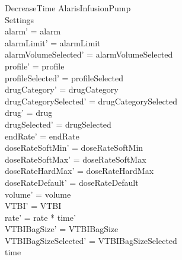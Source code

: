 \begin{schema}{DecreaseTime}
	\Delta AlarisInfusionPump\\
	 Settings\\
	\where
	alarm' = alarm\\
	alarmLimit' = alarmLimit\\
	alarmVolumeSelected' = alarmVolumeSelected\\
	profile' = profile\\
	profileSelected' = profileSelected\\
	drugCategory' = drugCategory\\ 
	drugCategorySelected' = drugCategorySelected\\
	drug' = drug\\ 
	drugSelected' = drugSelected\\
	endRate' = endRate\\
	doseRateSoftMin' = doseRateSoftMin\\
	doseRateSoftMax' = doseRateSoftMax\\
	doseRateHardMax' = doseRateHardMax\\
	doseRateDefault' = doseRateDefault\\
	volume' = volume\\
	VTBI' = VTBI\\
	rate' = rate * time'\\
	VTBIBagSize' = VTBIBagSize\\ 
	VTBIBagSizeSelected' = VTBIBagSizeSelected\\
	time \\

\end{schema}
